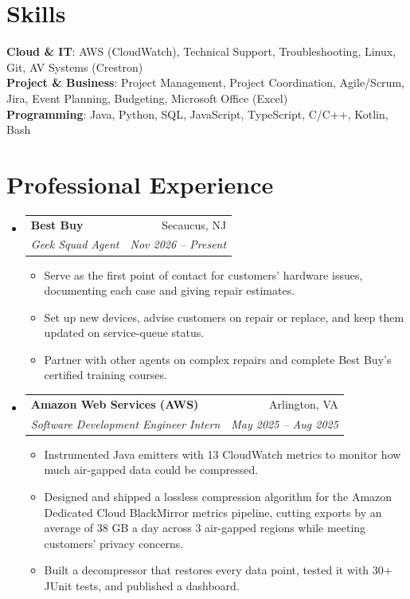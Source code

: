 \documentclass[letterpaper,11pt]{article}
\makeatletter
\newcommand{\resumeItem}[1]{\item\small{#1}}
\newcommand{\resumeSubheading}[4]{
  \vspace{-2pt}\item
    \begin{tabular*}{0.97\textwidth}[t]{l@{\extracolsep{\fill}}r}
      \textbf{#1} & #2 \\
      \textit{\small#3} & \textit{\small #4} \\
    \end{tabular*}\vspace{-7pt}
}
\newcommand{\resumeSubHeadingListStart}{\begin{itemize}[leftmargin=0.15in, label={}, itemsep=1pt, parsep=0pt, topsep=2pt]}
\newcommand{\resumeSubHeadingListEnd}{\end{itemize}}
\newcommand{\resumeItemListStart}{\begin{itemize}[topsep=6pt,itemsep=0pt,parsep=0pt,partopsep=0pt]}
\newcommand{\resumeItemListEnd}{\end{itemize}\vspace{-5pt}}
\makeatother
\begin{document}
\section{Skills}
\begin{itemize}[leftmargin=0.15in, label={}]
    \small{\item{
      \textbf{Cloud \& IT}{: AWS (CloudWatch), Technical Support, Troubleshooting, Linux, Git, AV Systems (Crestron)} \\
      \textbf{Project \& Business}{: Project Management, Project Coordination, Agile/Scrum, Jira, Event Planning, Budgeting, Microsoft Office (Excel)} \\
      \textbf{Programming}{: Java, Python, SQL, JavaScript, TypeScript, C/C++, Kotlin, Bash}
    }}
\end{itemize}

\section{Professional Experience}
  \resumeSubHeadingListStart
    \resumeSubheading
      {Best Buy}{Secaucus, NJ}
      {Geek Squad Agent}{Nov 2026 -- Present}
      \resumeItemListStart
        \resumeItem{Serve as the first point of contact for customers' hardware issues, documenting each case and giving repair estimates.}
        \resumeItem{Set up new devices, advise customers on repair or replace, and keep them updated on service-queue status.}
        \resumeItem{Partner with other agents on complex repairs and complete Best Buy's certified training courses.}
      \resumeItemListEnd
    \resumeSubheading
      {Amazon Web Services (AWS)}{Arlington, VA}
      {Software Development Engineer Intern}{May 2025 -- Aug 2025}
      \resumeItemListStart
        \resumeItem{Instrumented Java emitters with 13 CloudWatch metrics to monitor how much air-gapped data could be compressed.}
        \resumeItem{Designed and shipped a lossless compression algorithm for the Amazon Dedicated Cloud BlackMirror metrics pipeline, cutting exports by an average of 38 GB a day across 3 air-gapped regions while meeting customers' privacy concerns.}
        \resumeItem{Built a decompressor that restores every data point, tested it with 30+ JUnit tests, and published a dashboard.}
      \resumeItemListEnd
  \resumeSubHeadingListEnd
\end{document}
